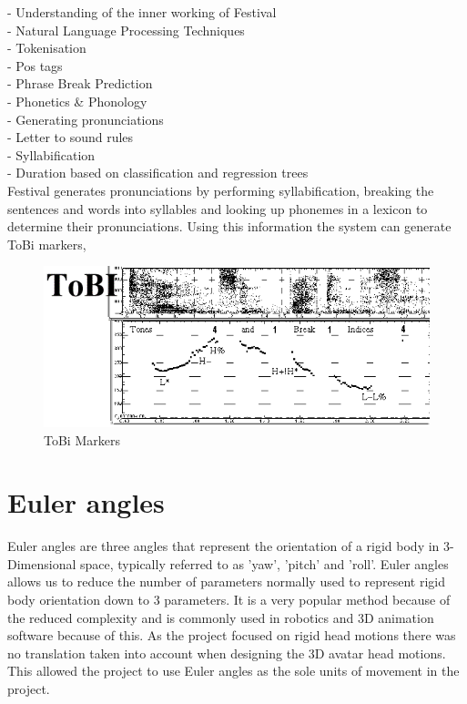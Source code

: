 \documentclass[bsc,frontabs,twoside,singlespacing,parskip]{infthesis}
\begin{document}
- Understanding of the inner working of Festival \\

- Natural Language Processing Techniques \\
- Tokenisation \\
- Pos tags \\
- Phrase Break Prediction \\
- Phonetics \& Phonology \\
- Generating pronunciations \\
- Letter to sound rules\\
- Syllabification\\
- Duration based on classification and regression trees \\
Festival generates pronunciations by performing syllabification, breaking the sentences and words into syllables and looking up phonemes in a lexicon to determine their pronunciations. Using this information the system can generate ToBi markers, 

\begin{figure}[h!]
	\centering
	\includegraphics[width=1\textwidth]{tobi.png}
	\caption{ToBi Markers}
\end{figure}

\section{Euler angles}

Euler angles are three angles that represent the orientation of a rigid body in 3-Dimensional space, typically referred to as 'yaw', 'pitch' and 'roll'. Euler angles allows us to reduce the number of parameters normally used to represent rigid body orientation down to 3 parameters. It is a very popular method because of the reduced complexity and is commonly used in robotics and 3D animation software because of this. As the project focused on rigid head motions there was no translation taken into account when designing the 3D avatar head motions. This allowed the project to use Euler angles as the sole units of movement in the project.
\end{document}

